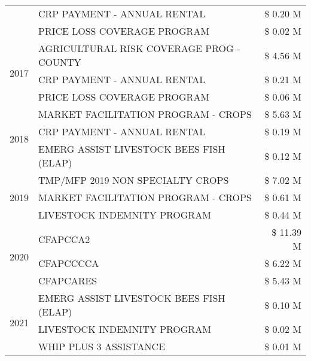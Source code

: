 \begin{tabular}{llr}
 & CRP PAYMENT - ANNUAL RENTAL & \$ 0.20 M \\
 & PRICE LOSS COVERAGE PROGRAM & \$ 0.02 M \\
\cline{1-3}
\multirow[t]{3}{*}{2017} & AGRICULTURAL RISK COVERAGE PROG - COUNTY & \$ 4.56 M \\
 & CRP PAYMENT - ANNUAL RENTAL & \$ 0.21 M \\
 & PRICE LOSS COVERAGE PROGRAM & \$ 0.06 M \\
\cline{1-3}
\multirow[t]{3}{*}{2018} & MARKET FACILITATION PROGRAM - CROPS & \$ 5.63 M \\
 & CRP PAYMENT - ANNUAL RENTAL & \$ 0.19 M \\
 & EMERG ASSIST LIVESTOCK BEES FISH (ELAP) & \$ 0.12 M \\
\cline{1-3}
\multirow[t]{3}{*}{2019} & TMP/MFP 2019 NON SPECIALTY CROPS & \$ 7.02 M \\
 & MARKET FACILITATION PROGRAM - CROPS & \$ 0.61 M \\
 & LIVESTOCK INDEMNITY PROGRAM & \$ 0.44 M \\
\cline{1-3}
\multirow[t]{3}{*}{2020} & CFAPCCA2 & \$ 11.39 M \\
 & CFAPCCCCA & \$ 6.22 M \\
 & CFAPCARES & \$ 5.43 M \\
\cline{1-3}
\multirow[t]{3}{*}{2021} & EMERG ASSIST LIVESTOCK BEES FISH (ELAP) & \$ 0.10 M \\
 & LIVESTOCK INDEMNITY PROGRAM & \$ 0.02 M \\
 & WHIP PLUS 3 ASSISTANCE & \$ 0.01 M \\
\cline{1-3}
\bottomrule
\end{tabular}
